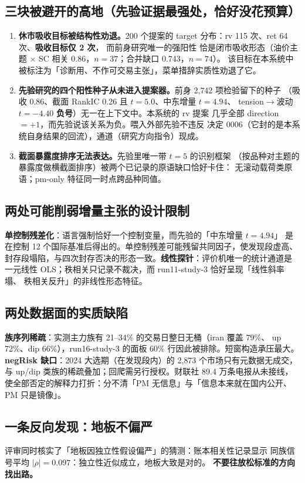 \documentclass[11pt]{ctexart}
\begin{document}
\subsection{三块被避开的高地（先验证据最强处，恰好没花预算）}
\begin{enumerate}\itemsep2pt
\item \textbf{休市吸收目标被结构性劝退。}200 个提案的 target 分布：rv 115 次、ret 64 次、\textbf{吸收目标仅 2 次}，
  而前身研究唯一的强阳性
  恰是闭市吸收形态（油价主题 $\times$ SC 相关 0.86，$n=37$；合并缺口 0.743，$n=74$）。
  该目标在本系统中被标注为「诊断用、不作可交易主张」，菜单措辞实质性劝退了它。
\item \textbf{先验研究的四个阳性种子从未进入提案器。}前身 2{,}742 项检验留下的种子
  （吸收 0.86、截面 RankIC 0.26 且 $t=5.0$、中东增量 $t=4.94$、
  tension$\to$波动 $t=-4.40$ \textbf{负号}）无一在上下文中。本系统的 rv 提案
  几乎全部 direction $=+1$，而先验说该关系为负。喂入外部先验不违反
  决定 0006（它封的是本系统自身结果的回流），通道（研究方向指令）现成。
\item \textbf{截面暴露度排序无法表达。}先验里唯一带 $t=5$ 的识别框架
  （按品种对主题的暴露度做横截面排序）被两个已记录的原语缺口恰好卡住：
  无滚动载荷类原语；pm-only 特征同一时点跨品种同值。
\end{enumerate}

\subsection{两处可能削弱增量主张的设计限制}
\textbf{单控制残差化}：语言强制恰好一个控制变量，而先验的「中东增量 $t=4.94$」
是在控制 12 个国际基准后得出的。单控制残差可能残留共同因子，使发现段虚高、
封存段塌陷，与四次封存否决的形态一致。\textbf{线性探针}：评价机唯一的统计通道是
一元线性 OLS；秩相关只记录不裁决，而 run11-study-3 恰好呈现「线性斜率塌、
秩相关反升」的非线性形态特征。

\subsection{两处数据面的实质缺陷}
\textbf{族序列稀疏}：实测主力族有 21--34\% 的交易日整日无桶（iran 覆盖 79\%、
up 72\%、dip 66\%），run16-study-3 的面板 60\% 行因此被排除。短窗构造承压最大。
\textbf{negRisk 缺口}：2024 大选期（在发现段内）的 2{,}873 个市场只有元数据无成交，
与 up/dip 类族的稀疏叠加；回爬需另行授权。财联社 89.4 万条电报从未接线，
使全部否定的解释力打折：分不清「PM 无信息」与「信息本来就在国内公开、PM 只是镜像」。

\subsection{一条反向发现：地板不偏严}
评审同时核实了「地板因独立性假设偏严」的猜测：账本相关性记录显示
同族信号平均 $|\rho|=0.097$：独立性近似成立，地板大致是对的。
\textbf{不要往放松标准的方向找出路。}
\end{document}
